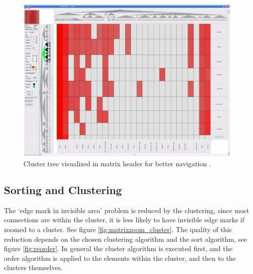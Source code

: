 \begin{figure}[h]
\centering
\includegraphics[width=\textwidth]{images/matrixzoom_abello}
\caption{Cluster tree visualized in matrix header for better navigation \citep{abello2004}. \label{fig:matrixzoom_abello}}
\end{figure}





\subsection{Sorting and Clustering}   

The ‘edge mark in invisible area' problem is reduced by the clustering, since most connections are within the cluster, it is less likely to have invisible edge marks if zoomed to a cluster. See figure \ref{fig:matrixzoom_cluster}. 
The quality of this reduction depends on the chosen clustering algorithm and the sort algorithm, see figure \ref{fig:reorder}. In general the cluster algorithm is executed first, and the order algorithm is applied to the elements within the cluster, and then to the clusters themselves.

